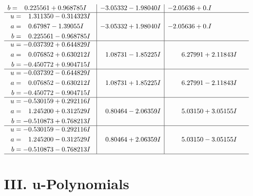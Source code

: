 \documentclass[1p]{elsarticle_modified}
\theoremstyle{definition}
\begin{document}
$$\begin{array}{c|c|c}
\begin{aligned}
b &= \phantom{-}0.225561 + 0.968785 I\end{aligned}
 & -3.05332 - 1.98040 I & -2.05636 + 0. I\phantom{ +0.000000I} \\ \hline\begin{aligned}
u &= \phantom{-}1.311350 - 0.314323 I \\
a &= \phantom{-}0.67987 - 1.39055 I \\
b &= \phantom{-}0.225561 - 0.968785 I\end{aligned}
 & -3.05332 + 1.98040 I & -2.05636 + 0. I\phantom{ +0.000000I} \\ \hline\begin{aligned}
u &= -0.037392 + 0.644829 I \\
a &= \phantom{-}0.076852 + 0.630212 I \\
b &= -0.450772 + 0.904715 I\end{aligned}
 & \phantom{-}1.08731 - 1.85225 I & \phantom{-}6.27991 + 2.11843 I \\ \hline\begin{aligned}
u &= -0.037392 - 0.644829 I \\
a &= \phantom{-}0.076852 - 0.630212 I \\
b &= -0.450772 - 0.904715 I\end{aligned}
 & \phantom{-}1.08731 + 1.85225 I & \phantom{-}6.27991 - 2.11843 I \\ \hline\begin{aligned}
u &= -0.530159 + 0.292116 I \\
a &= \phantom{-}1.245200 + 0.312529 I \\
b &= -0.510873 + 0.768213 I\end{aligned}
 & \phantom{-}0.80464 - 2.06359 I & \phantom{-}5.03150 + 3.05155 I \\ \hline\begin{aligned}
u &= -0.530159 - 0.292116 I \\
a &= \phantom{-}1.245200 - 0.312529 I \\
b &= -0.510873 - 0.768213 I\end{aligned}
 & \phantom{-}0.80464 + 2.06359 I & \phantom{-}5.03150 - 3.05155 I\\
 \hline 
 \end{array}$$\newpage
\newpage\renewcommand{\arraystretch}{1}
\centering \section*{ III. u-Polynomials}
\end{document}
